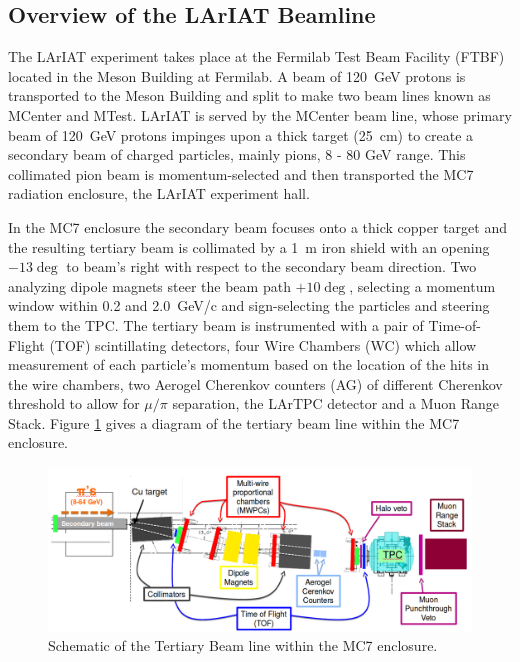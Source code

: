 \subsection{Overview of the LArIAT Beamline}\label{sec:beamline}
The LArIAT experiment takes place at the Fermilab Test Beam Facility (FTBF) located in the Meson Building at Fermilab. A beam of 120~GeV protons is transported to the Meson Building and split to make two beam lines known as MCenter and MTest. LArIAT is served by the MCenter beam line, whose primary beam of 120~GeV protons impinges upon a thick target (25~cm) to create a secondary beam of charged particles, mainly pions, 8 - 80 GeV range. This collimated pion beam is momentum-selected and then transported the MC7 radiation enclosure, the LArIAT experiment hall.  

In the MC7 enclosure the secondary beam focuses onto a thick copper target and the resulting tertiary beam is collimated by a 1~m iron shield with an opening $-13\deg$ to beam's right with respect to the secondary beam direction. Two analyzing dipole magnets steer the beam path $+10\deg$, selecting a momentum window within 0.2 and 2.0~GeV/c and sign-selecting the particles and steering them to the TPC. The tertiary beam is instrumented with a pair of Time-of-Flight (TOF) scintillating detectors,  four Wire Chambers (WC) which allow measurement of each particle's momentum based on the location of the hits in the wire chambers, two Aerogel Cherenkov counters (AG) of different Cherenkov threshold to allow for $\mu / \pi$ separation, the LArTPC detector and a Muon Range Stack. Figure \ref{fig:beamlineschematic} gives a diagram of the tertiary beam line within the MC7 enclosure.

\begin{figure}[htb]
\begin{center}
\includegraphics[scale=0.25]{./images/mc7beamline.png}
\end{center}
\caption{Schematic of the Tertiary Beam line within the MC7 enclosure.}
\label{fig:beamlineschematic}
\end{figure}


